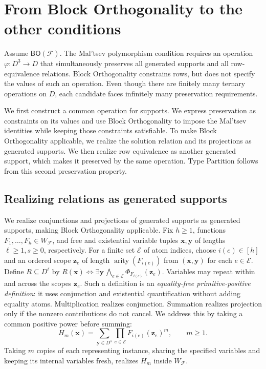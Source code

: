 \documentclass[11pt,letterpaper,onecolumn]{article}
\theoremstyle{plain}
\theoremstyle{definition}
\theoremstyle{remark}
\newcommand{\cF}{\mathcal F}
\newcommand{\BO}{\mathsf{BO}}
\newcommand{\SuppRel}[1]{\Phi_{#1}}
\DeclareMathOperator{\arity}{arity}
\begin{document}
\section{From Block Orthogonality to the other conditions}
\label{s:sec:structural}

Assume $\BO(\cF)$. The Mal'tsev polymorphism condition requires an
operation $\varphi:D^3\to D$ that simultaneously preserves all generated
supports and all row-equivalence relations. Block Orthogonality
constrains rows, but does not specify the values of such an operation.
Even though there are finitely many ternary operations on $D$, each
candidate faces infinitely many preservation requirements.

We first construct a common operation for supports. We express
preservation as constraints on its values and use Block Orthogonality
to impose the Mal'tsev identities while keeping those constraints
satisfiable. To make Block Orthogonality applicable, we realize the
solution relation and its projections as generated supports. We then
realize row equivalence as another generated support, which makes it
preserved by the same operation. Type Partition follows from this
second preservation property.

\subsection{Realizing relations as generated supports}

We realize conjunctions and projections of generated supports as generated
supports, making Block Orthogonality applicable.
Fix $h\ge1$, functions $F_1,\ldots,F_h\in W_{\cF}$, and free and
existential variable tuples $\mathbf x,\mathbf y$ of lengths
$\ell\ge1,s\ge0$, respectively. For a finite set $\mathcal E$ of atom
indices, choose $i(e)\in[h]$ and an ordered scope $\mathbf z_e$ of length
$\arity(F_{i(e)})$ from $(\mathbf x,\mathbf y)$ for each $e\in\mathcal E$.
Define $R\subseteq D^\ell$ by
$R(\mathbf x)\Longleftrightarrow
\exists\mathbf y\,\bigwedge_{e\in\mathcal E}
\SuppRel{F_{i(e)}}(\mathbf z_e)$. Variables may repeat within and across
the scopes $\mathbf z_e$. Such a definition is an
\emph{equality-free primitive-positive definition}: it uses conjunction
and existential quantification without adding equality atoms.
Multiplication realizes conjunction. Summation realizes projection only
if the nonzero contributions do not cancel. We address this by taking
a common positive power before summing:
\begin{equation}
 H_m(\mathbf x)=\sum_{\mathbf y\in D^s}
                   \prod_{e\in\mathcal E}F_{i(e)}(\mathbf z_e)^m,
 \qquad m\ge1.
 \label{s:eq:support-realization}
\end{equation}
Taking $m$ copies of each representing instance, sharing the specified
variables and keeping its internal variables fresh, realizes $H_m$
inside $W_{\cF}$.
\end{document}
